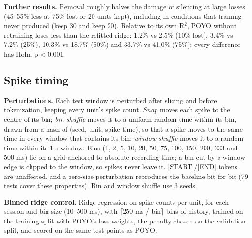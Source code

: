 \documentclass[11pt]{article}
\begin{document}
\textbf{Further results.} Removal roughly halves the damage of silencing at large losses (45--55\% less at 75\% lost or 20 units kept), including in conditions that training never produced (keep 30 and keep 20). Relative to its own R$^{2}$, POYO without retraining loses less than the refitted ridge: 1.2\% vs 2.5\% (10\% lost), 3.4\% vs 7.2\% (25\%), 10.3\% vs 18.7\% (50\%) and 33.7\% vs 41.0\% (75\%); every difference has Holm p < 0.001.

\subsection{Spike timing}

\textbf{Perturbations.} Each test window is perturbed after slicing and before tokenization, keeping every unit's spike count. \emph{Snap} moves each spike to the centre of its bin; \emph{bin shuffle} moves it to a uniform random time within its bin, drawn from a hash of (seed, unit, spike time), so that a spike moves to the same time in every window that contains its bin; \emph{window shuffle} moves it to a random time within its 1 s window. Bins (1, 2, 5, 10, 20, 50, 75, 100, 150, 200, 333 and 500 ms) lie on a grid anchored to absolute recording time; a bin cut by a window edge is clipped to the window, so spikes never leave it. [START]/[END] tokens are unaffected, and a zero-size perturbation reproduces the baseline bit for bit (79 tests cover these properties). Bin and window shuffle use 3 seeds.

\textbf{Binned ridge control.} Ridge regression on spike counts per unit, for each session and bin size (10--500 ms), with $\lceil$250 ms / bin$\rceil$ bins of history, trained on the training split with POYO's loss weights, the penalty chosen on the validation split, and scored on the same test points as POYO.
\end{document}
